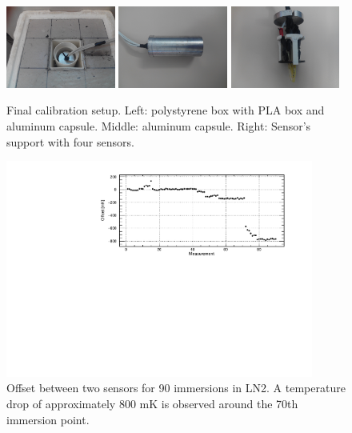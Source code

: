\begin{figure}[htbp]
\centering
\includegraphics[width=0.32\textwidth]{images/figure_4_a.jpg}
\includegraphics[width=0.32\textwidth]{images/figure_4_b.jpg}
\includegraphics[width=0.32\textwidth]{images/figure_4_c.jpg}
\caption{Final calibration setup. Left: polystyrene box with PLA box and aluminum capsule. Middle: aluminum capsule. Right: Sensor's support with four sensors.
\label{fig:setup_final}}
\end{figure}

\begin{figure}[htbp]
\centering
\includegraphics[width=0.9\textwidth]{images/figure_5.pdf}
\caption{Offset between two sensors for 90 immersions in LN2. A temperature drop of approximately 800 mK is observed around the 70th immersion point.
\label{fig:broken_sensor_evolution}}
\end{figure}

